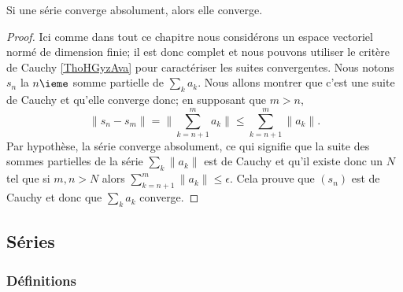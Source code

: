 \begin{lemma}   \label{LemNEoaaPt}
    Si une série converge absolument, alors elle converge.
\end{lemma}

\begin{proof}
    Ici comme dans tout ce chapitre nous considérons un espace vectoriel normé de dimension finie; il est donc complet et nous pouvons utiliser le critère de Cauchy \ref{ThoHGyzAva} pour caractériser les suites convergentes. Nous notons \( s_n\) la \( n\ieme\) somme partielle de \( \sum_k a_k\). Nous allons montrer que c'est une suite de Cauchy et qu'elle converge donc; en supposant que \( m>n\),
    \begin{equation}
        \| s_n-s_m \|=\| \sum_{k=n+1}^m a_k \|\leq \sum_{k=n+1}^m\| a_k \|.
    \end{equation}
    Par hypothèse, la série converge absolument, ce qui signifie que la suite des sommes partielles de la série \( \sum_k\| a_k \|\) est de Cauchy et qu'il existe donc un \( N\) tel que si \( m,n>N\) alors \( \sum_{k=n+1}^m\| a_k \|\leq \epsilon\). Cela prouve que \( (s_n)\) est de Cauchy et donc que \( \sum_ka_k\) converge.
\end{proof}

\subsection{Séries}

\subsubsection{Définitions}

